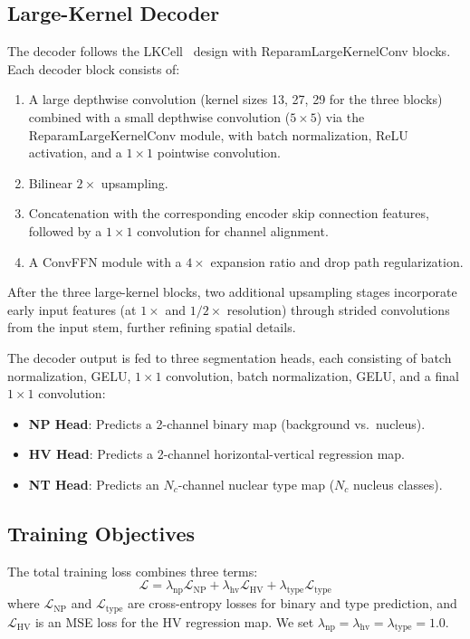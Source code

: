 \documentclass[conference]{IEEEtran}
\begin{document}
\subsection{Large-Kernel Decoder}

The decoder follows the LKCell~\cite{lkcell} design with ReparamLargeKernelConv blocks. Each decoder block consists of:

\begin{enumerate}
    \item A large depthwise convolution (kernel sizes 13, 27, 29 for the three blocks) combined with a small depthwise convolution ($5{\times}5$) via the ReparamLargeKernelConv module, with batch normalization, ReLU activation, and a $1{\times}1$ pointwise convolution.
    \item Bilinear $2\times$ upsampling.
    \item Concatenation with the corresponding encoder skip connection features, followed by a $1{\times}1$ convolution for channel alignment.
    \item A ConvFFN module with a $4\times$ expansion ratio and drop path regularization.
\end{enumerate}

After the three large-kernel blocks, two additional upsampling stages incorporate early input features (at $1\times$ and $1/2\times$ resolution) through strided convolutions from the input stem, further refining spatial details.

The decoder output is fed to three segmentation heads, each consisting of batch normalization, GELU, $1{\times}1$ convolution, batch normalization, GELU, and a final $1{\times}1$ convolution:
\begin{itemize}
    \item \textbf{NP Head}: Predicts a 2-channel binary map (background vs.\ nucleus).
    \item \textbf{HV Head}: Predicts a 2-channel horizontal-vertical regression map.
    \item \textbf{NT Head}: Predicts an $N_c$-channel nuclear type map ($N_c$ nucleus classes).
\end{itemize}

\subsection{Training Objectives}

The total training loss combines three terms:
\begin{equation}
    \mathcal{L} = \lambda_{\text{np}} \mathcal{L}_{\text{NP}} + \lambda_{\text{hv}} \mathcal{L}_{\text{HV}} + \lambda_{\text{type}} \mathcal{L}_{\text{type}}
\end{equation}
where $\mathcal{L}_{\text{NP}}$ and $\mathcal{L}_{\text{type}}$ are cross-entropy losses for binary and type prediction, and $\mathcal{L}_{\text{HV}}$ is an MSE loss for the HV regression map. We set $\lambda_{\text{np}}=\lambda_{\text{hv}}=\lambda_{\text{type}}=1.0$.
\end{document}
